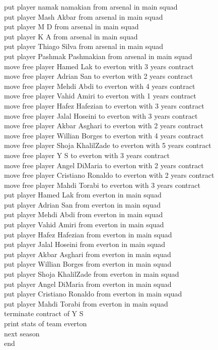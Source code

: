 \documentclass[]{article}
\begin{document}
{put player namak namakian from arsenal in main squad\\
put player Mash Akbar from arsenal in main squad\\
put player M D from arsenal in main squad\\
put player K A from arsenal in main squad\\
put player Thiago Silva from arsenal in main squad\\
put player Pashmak Pashmakian from arsenal in main squad\\
move free player Hamed Lak to everton with 3 years contract\\
move free player Adrian San to everton with 2 years contract\\
move free player Mehdi Abdi to everton with 4 years contract\\
move free player Vahid Amiri to everton with 1 years contract\\
move free player Hafez Hafezian to everton with 3 years contract\\
move free player Jalal Hoseini to everton with 3 years contract\\
move free player Akbar Asghari to everton with 2 years contract\\
move free player Willian Borges to everton with 4 years contract\\
move free player Shoja KhalilZade to everton with 5 years contract\\
move free player Y S to everton with 3 years contract\\
move free player Angel DiMaria to everton with 2 years contract\\
move free player Cristiano Ronaldo to everton with 2 years contract\\
move free player Mahdi Torabi to everton with 3 years contract\\
put player Hamed Lak from everton in main squad\\
put player Adrian San from everton in main squad\\
put player Mehdi Abdi from everton in main squad\\
put player Vahid Amiri from everton in main squad\\
put player Hafez Hafezian from everton in main squad\\
put player Jalal Hoseini from everton in main squad\\
put player Akbar Asghari from everton in main squad\\
put player Willian Borges from everton in main squad\\
put player Shoja KhalilZade from everton in main squad\\
put player Angel DiMaria from everton in main squad\\
put player Cristiano Ronaldo from everton in main squad\\
put player Mahdi Torabi from everton in main squad\\
terminate contract of Y S\\
print stats of team everton\\
next season\\
end
}
\end{document}
